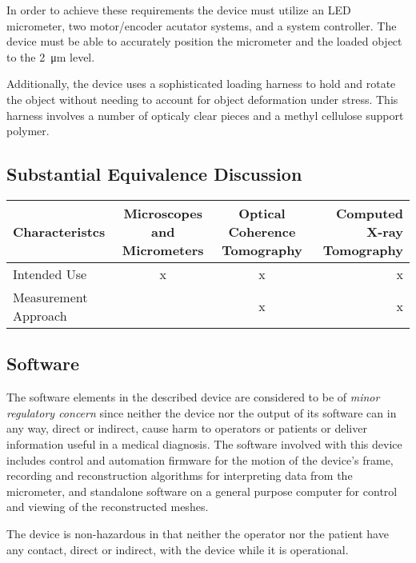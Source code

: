 \documentclass{article}
\begin{document}
In order to achieve these requirements the device must utilize an LED
micrometer, two motor/encoder acutator systems, and a system
controller. The device must be able to accurately position the
micrometer and the loaded object to the \SI{2}{\micro m} level.

Additionally, the device uses a sophisticated loading harness to hold
and rotate the object without needing to account for object
deformation under stress. This harness involves a number of opticaly
clear pieces and a methyl cellulose support polymer.

\subsection{Substantial Equivalence Discussion}

\begin{center}
  \begin{tabular}{|l|c|c|r}
    \hline
    Characteristcs & Microscopes and Micrometers & Optical Coherence Tomography & Computed X-ray Tomography \\ \hline
    Intended Use & x & x & x \\ \hline
    Measurement Approach &   & x & x \\ \hline
    
    \hline
  \end{tabular}
\end{center}





\subsection{Software}

The software elements in the described device are considered to be of
\textit{minor regulatory concern} since neither the device nor the
output of its software can in any way, direct or indirect, cause harm
to operators or patients or deliver information useful in a medical
diagnosis. The software involved with this device includes control and
automation firmware for the motion of the device's frame, recording
and reconstruction algorithms for interpreting data from the
micrometer, and standalone software on a general purpose computer for
control and viewing of the reconstructed meshes.

The device is non-hazardous in that neither the operator nor the
patient have any contact, direct or indirect, with the device while it
is operational.
\end{document}
